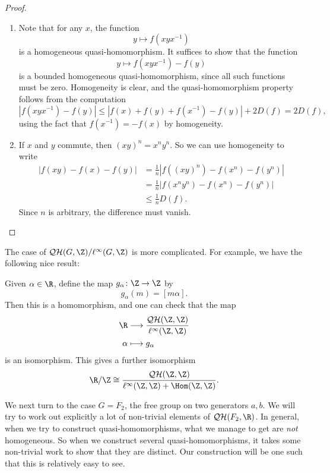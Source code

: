 \documentclass[a4paper]{article}
\newcommand\QH{\mathcal{QH}}
\newcommand\Free{F}
\begin{document}
\begin{proof}\leavevmode
  \begin{enumerate}
    \item Note that for any $x$, the function
      \[
        y \mapsto f(xyx^{-1})
      \]
      is a homogeneous quasi-homomorphism. It suffices to show that the function
      \[
        y \mapsto f(xyx^{-1}) - f(y)
      \]
      is a bounded homogeneous quasi-homomorphism, since all such functions must be zero. Homogeneity is clear, and the quasi-homomorphism property follows from the computation
      \[
        |f(xyx^{-1}) - f(y)| \leq |f(x) + f(y) + f(x^{-1}) - f(y)| + 2D(f) = 2D(f),
      \]
      using the fact that $f(x^{-1}) = -f(x)$ by homogeneity.
    \item If $x$ and $y$ commute, then $(xy)^n = x^n y^n$. So we can use homogeneity to write
      \begin{align*}
        |f(xy) - f(x) - f(y)| &= \frac{1}{n} |f((xy)^n) - f(x^n) - f(y^n)|\\
        &= \frac{1}{n} | f(x^n y^n) - f(x^n) - f(y^n)|\\
        &\leq \frac{1}{n} D(f).
      \end{align*}
      Since $n$ is arbitrary, the difference must vanish.
  \end{enumerate}
\end{proof}

The case of $\QH(G, \Z)/\ell^\infty(G, \Z)$ is more complicated. For example, we have the following nice result:
\begin{eg}
  Given $\alpha \in \R$, define the map $g_\alpha\colon \Z \to \Z$ by
  \[
    g_\alpha(m) = [m\alpha].
  \]
  Then this is a homomorphism, and one can check that the map
  \begin{align*}
    \R &\longrightarrow \frac{\QH(\Z, \Z)}{\ell^\infty(\Z, \Z)}\\
    \alpha &\longmapsto g_\alpha
  \end{align*}
  is an isomorphism. This gives a further isomorphism
  \[
    \R/\Z \cong \frac{\QH(\Z, \Z)}{\ell^\infty(\Z, \Z) + \Hom(\Z, \Z)}.
  \]
\end{eg}

We next turn to the case $G = \Free_2$, the free group on two generators $a, b$. We will try to work out explicitly a lot of non-trivial elements of $\QH(\Free_2, \R)$. In general, when we try to construct quasi-homomorphisms, what we manage to get are \emph{not} homogeneous. So when we construct several quasi-homomorphisms, it takes some non-trivial work to show that they are distinct. Our construction will be one such that this is relatively easy to see.
\end{document}
